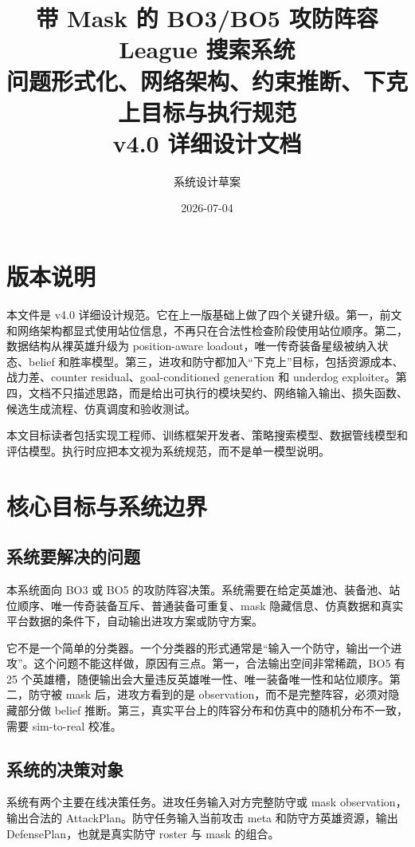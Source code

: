 \documentclass[UTF8,12pt,openany]{ctexbook}
\title{\Huge 带 Mask 的 BO3/BO5 攻防阵容 League 搜索系统\\[6pt]\Large 问题形式化、网络架构、约束推断、下克上目标与执行规范\\[12pt]\large v4.0 详细设计文档}
\author{系统设计草案}
\date{2026-07-04}
\begin{document}
\maketitle
\thispagestyle{empty}
\clearpage
\chapter*{版本说明}
本文件是 v4.0 详细设计规范。它在上一版基础上做了四个关键升级。第一，前文和网络架构都显式使用站位信息，不再只在合法性检查阶段使用站位顺序。第二，数据结构从裸英雄升级为 position-aware loadout，唯一传奇装备星级被纳入状态、belief 和胜率模型。第三，进攻和防守都加入“下克上”目标，包括资源成本、战力差、counter residual、goal-conditioned generation 和 underdog exploiter。第四，文档不只描述思路，而是给出可执行的模块契约、网络输入输出、损失函数、候选生成流程、仿真调度和验收测试。

本文目标读者包括实现工程师、训练框架开发者、策略搜索模型、数据管线模型和评估模型。执行时应把本文视为系统规范，而不是单一模型说明。
\tableofcontents
\clearpage

\mainmatter

\chapter{核心目标与系统边界}

\section{系统要解决的问题}
本系统面向 BO3 或 BO5 的攻防阵容决策。系统需要在给定英雄池、装备池、站位顺序、唯一传奇装备互斥、普通装备可重复、mask 隐藏信息、仿真数据和真实平台数据的条件下，自动输出进攻方案或防守方案。

它不是一个简单的分类器。一个分类器的形式通常是“输入一个防守，输出一个进攻”。这个问题不能这样做，原因有三点。第一，合法输出空间非常稀疏，BO5 有 25 个英雄槽，随便输出会大量违反英雄唯一性、唯一装备唯一性和站位顺序。第二，防守被 mask 后，进攻方看到的是 observation，而不是完整阵容，必须对隐藏部分做 belief 推断。第三，真实平台上的阵容分布和仿真中的随机分布不一致，需要 sim-to-real 校准。

\section{系统的决策对象}
系统有两个主要在线决策任务。进攻任务输入对方完整防守或 mask observation，输出合法的 AttackPlan。防守任务输入当前攻击 meta 和防守方英雄资源，输出 DefensePlan，也就是真实防守 roster 与 mask 的组合。
\end{document}
